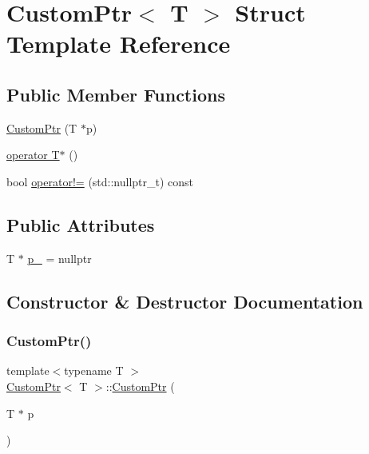 \hypertarget{structCustomPtr}{}\section{Custom\+Ptr$<$ T $>$ Struct Template Reference}
\label{structCustomPtr}
\subsection*{Public Member Functions}
\begin{DoxyCompactItemize}
\item 
\hyperlink{structCustomPtr_a33d9b42cfaf6cc6bd38ec9516d084672}{Custom\+Ptr} (T $\ast$p)
\item 
\hyperlink{structCustomPtr_a72e3480bc1d07b5f51cfee87a00b8483}{operator T$\ast$} ()
\item 
bool \hyperlink{structCustomPtr_a142dc4845d552d6fa07fd702744a8971}{operator!=} (std\+::nullptr\+\_\+t) const
\end{DoxyCompactItemize}
\subsection*{Public Attributes}
\begin{DoxyCompactItemize}
\item 
T $\ast$ \hyperlink{structCustomPtr_a3d7cbc9f1a2ba51a9c2fb819acb8955c}{p\+\_\+} = nullptr
\end{DoxyCompactItemize}


\subsection{Constructor \& Destructor Documentation}
\mbox{\label{structCustomPtr_a33d9b42cfaf6cc6bd38ec9516d084672}} 
\subsubsection{\texorpdfstring{Custom\+Ptr()}{CustomPtr()}}
{\footnotesize\ttfamily template$<$typename T $>$ \\
\hyperlink{structCustomPtr}{Custom\+Ptr}$<$ T $>$\+::\hyperlink{structCustomPtr}{Custom\+Ptr} (\begin{DoxyParamCaption}\item[{T $\ast$}]{p }\end{DoxyParamCaption})\hspace{0.3cm}{\ttfamily [inline]}}



